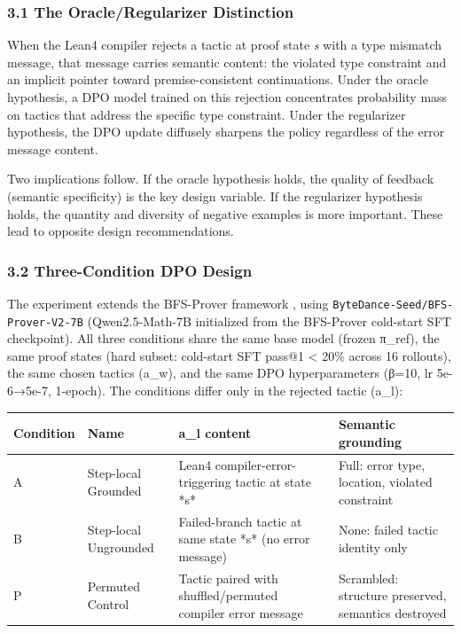 
\subsubsection{3.1 The Oracle/Regularizer Distinction}

When the Lean4 compiler rejects a tactic at proof state \textit{s} with a type mismatch message, that message carries semantic content: the violated type constraint and an implicit pointer toward premise-consistent continuations. Under the oracle hypothesis, a DPO model trained on this rejection concentrates probability mass on tactics that address the specific type constraint. Under the regularizer hypothesis, the DPO update diffusely sharpens the policy regardless of the error message content.

Two implications follow. If the oracle hypothesis holds, the quality of feedback (semantic specificity) is the key design variable. If the regularizer hypothesis holds, the quantity and diversity of negative examples is more important. These lead to opposite design recommendations.

\subsubsection{3.2 Three-Condition DPO Design}

The experiment extends the BFS-Prover framework \citep{Xinetal2025}, using \texttt{ByteDance-Seed/BFS-Prover-V2-7B} (Qwen2.5-Math-7B initialized from the BFS-Prover cold-start SFT checkpoint). All three conditions share the same base model (frozen π_ref), the same proof states (hard subset: cold-start SFT pass@1 < 20\% across 16 rollouts), the same chosen tactics (a_w), and the same DPO hyperparameters (β=10, lr 5e-6→5e-7, 1-epoch). The conditions differ only in the rejected tactic (a_l):

\begin{table}[htbp]
\centering
\begin{tabular}{llll}
\toprule
Condition & Name & a_l content & Semantic grounding \\
\midrule
A & Step-local Grounded & Lean4 compiler-error-triggering tactic at state *s* & Full: error type, location, violated constraint \\
B & Step-local Ungrounded & Failed-branch tactic at same state *s* (no error message) & None: failed tactic identity only \\
P & Permuted Control & Tactic paired with shuffled/permuted compiler error message & Scrambled: structure preserved, semantics destroyed \\
\bottomrule
\end{tabular}
\end{table}

